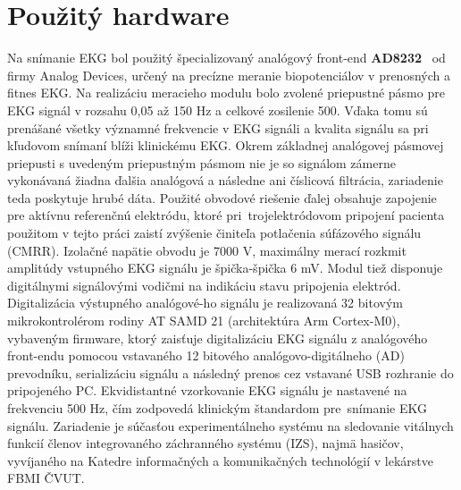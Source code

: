 \section{Použitý hardware}

Na snímanie EKG bol použitý špecializovaný analógový front-end \textbf{AD8232}~\cite{Analog_Devices} od firmy Analog Devices, určený na precízne meranie biopotenciálov v prenosných a fitnes EKG. Na realizáciu meracieho modulu bolo zvolené priepustné pásmo pre EKG signál v rozsahu 0,05 až 150 Hz a celkové zosilenie 500. Vďaka tomu sú prenášané všetky významné frekvencie v EKG signáli a kvalita signálu sa pri kľudovom snímaní blíži klinickému EKG. Okrem základnej analógovej pásmovej priepusti s uvedeným priepustným pásmom nie je so signálom zámerne vykonávaná žiadna ďalšia analógová a následne ani číslicová filtrácia, zariadenie teda poskytuje hrubé dáta. Použité obvodové riešenie ďalej obsahuje zapojenie pre aktívnu referenčnú elektródu, ktoré pri~trojelektródovom pripojení pacienta použitom v tejto práci zaistí zvýšenie činiteľa potlačenia súfázového signálu (CMRR). Izolačné napätie obvodu je 7000 V, maximálny merací rozkmit amplitúdy vstupného EKG signálu je špička-špička 6 mV. Modul tiež disponuje digitálnymi signálovými vodičmi na indikáciu stavu pripojenia elektród. Digitalizácia výstupného analógové-ho signálu je realizovaná 32 bitovým mikrokontrolérom rodiny AT SAMD 21 (architektúra Arm Cortex-M0), vybaveným firmware, ktorý zaisťuje digitalizáciu EKG signálu z analógového front-endu pomocou vstavaného 12 bitového analógovo-digitálneho (AD) prevodníku, serializáciu signálu a následný prenos cez vstavané USB rozhranie do pripojeného PC. Ekvidistantné vzorkovanie EKG signálu je nastavené na frekvenciu 500 Hz, čím zodpovedá klinickým štandardom pre~snímanie EKG signálu. Zariadenie je súčasťou experimentálneho systému na sledovanie vitálnych funkcií členov integrovaného záchranného systému (IZS), najmä hasičov, vyvíjaného na Katedre informačných a komunikačných technológií v lekárstve FBMI ČVUT.  

